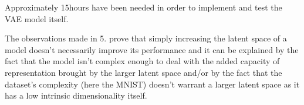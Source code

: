 Approximately 15hours have been needed in order to implement and test the VAE model itself.


The observations made in 5. prove that simply increasing the latent space of a model doesn't necessarily improve its performance and it can be explained by the fact that the model isn't complex enough to deal with the added capacity of representation brought by the larger latent space and/or by the fact that the dataset's complexity (here the MNIST) doesn't warrant a larger latent space as it has a low intrinsic dimensionality itself. 